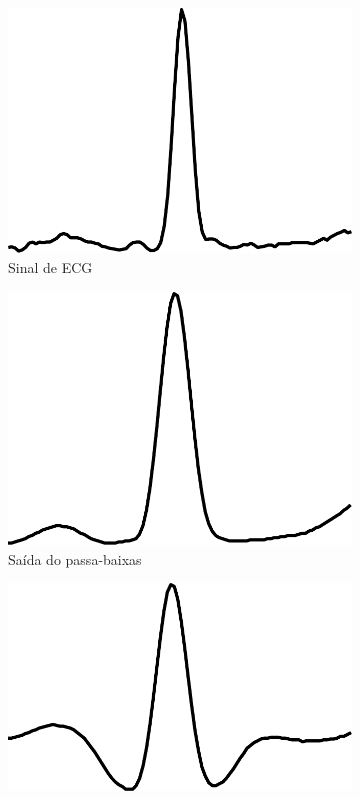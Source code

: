 \begin{figure}[ht]
    \centering
    \begin{subfigure}[b]{.3\textwidth}
        \includegraphics[width=\textwidth]{figures/chap6-original.pdf}
        \caption{Sinal de ECG}
    \end{subfigure}
    \begin{subfigure}[b]{.3\textwidth}
        \includegraphics[width=\textwidth]{figures/chap6-lowpass.pdf}
        \caption{Saída do passa-baixas}
    \end{subfigure}
    \begin{subfigure}[b]{.3\textwidth}
        \includegraphics[width=\textwidth]{figures/chap6-highpass.pdf}

\end{subfigure}
\end{figure}
